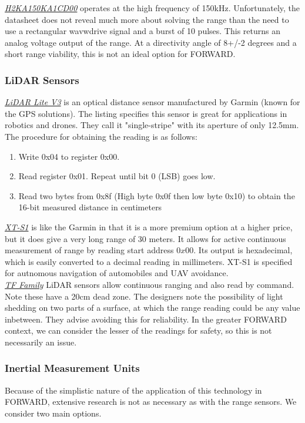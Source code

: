 \noindent \underline{\textit{H2KA150KA1CD00}} operates at the high frequency of 150kHz. Unfortunately, the datasheet does not reveal much more about solving the range than the need to use a rectangular wavwdrive signal and a burst of 10 pulses. This returns an analog voltage output of the range. At a directivity angle of 8+/-2 degrees and a short range viability, this is not an ideal option for FORWARD.\\

\subsubsection{LiDAR Sensors}
\noindent \underline{\textit{LiDAR Lite V3}} is an optical distance sensor manufactured by Garmin (known for the GPS solutions). The listing specifies this sensor is great for applications in robotics and drones. They call it "single-stripe" with its aperture of only 12.5mm. The procedure for obtaining the reading is as follows:
\begin{enumerate}
	\item Write 0x04 to register 0x00.
	\item Read register 0x01. Repeat until bit 0 (LSB) goes low.
	\item Read two bytes from 0x8f (High byte 0x0f then low byte 0x10) to obtain the 16-bit measured distance in centimeters
\end{enumerate}

\noindent \underline{\textit{XT-S1}} is like the Garmin in that it is a more premium option at a higher price, but it does give a very long range of 30 meters. It allows for active continuous measurement of range by reading start address $0x00$. Its output is hexadecimal, which is easily converted to a decimal reading in millimeters. XT-S1 is specified for autnomous navigation of automobiles and UAV avoidance.\\

\noindent \underline{\textit{TF Family}} LiDAR sensors allow continuous ranging and also read by command. Note these have a 20cm dead zone. The designers note the possibility of light shedding on two parts of a surface, at which the range reading could be any value inbetween. They advise avoiding this for reliability. In the greater FORWARD context, we can consider the lesser of the readings for safety, so this is not necessarily an issue.\\

\subsubsection{Inertial Measurement Units}
\noindent Because of the simplistic nature of the application of this technology in FORWARD, extensive research is not as necessary as with the range sensors. We consider two main options.\\


